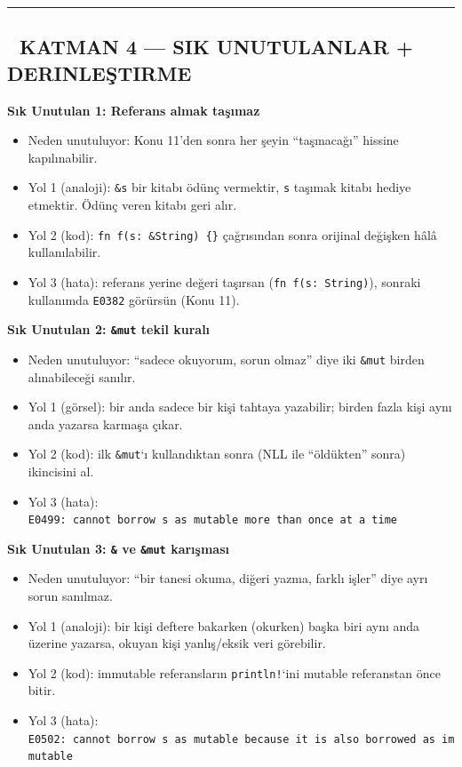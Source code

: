 \documentclass[12pt,a4paper]{article}
\begin{document}
\begin{center}\rule{0.5\linewidth}{0.5pt}\end{center}

\subsection{🔴 KATMAN 4 --- SIK UNUTULANLAR + DERINLEŞTIRME}\label{katman-4-—-sik-unutulanlar-derinleştirme-11}

\textbf{Sık Unutulan 1: Referans almak taşımaz}

\begin{itemize}
\tightlist
\item
  Neden unutuluyor: Konu 11'den sonra her şeyin ``taşınacağı'' hissine kapılınabilir.
\item
  Yol 1 (analoji): \texttt{\&s} bir kitabı ödünç vermektir, \texttt{s} taşımak kitabı hediye etmektir. Ödünç veren kitabı geri alır.
\item
  Yol 2 (kod): \texttt{fn\ f(s:\ \&String)\ \{\}} çağrısından sonra orijinal değişken hâlâ kullanılabilir.
\item
  Yol 3 (hata): referans yerine değeri taşırsan (\texttt{fn\ f(s:\ String)}), sonraki kullanımda \texttt{E0382} görürsün (Konu 11).
\end{itemize}

\textbf{Sık Unutulan 2: \texttt{\&mut} tekil kuralı}

\begin{itemize}
\tightlist
\item
  Neden unutuluyor: ``sadece okuyorum, sorun olmaz'' diye iki \texttt{\&mut} birden alınabileceği sanılır.
\item
  Yol 1 (görsel): bir anda sadece bir kişi tahtaya yazabilir; birden fazla kişi aynı anda yazarsa karmaşa çıkar.
\item
  Yol 2 (kod): ilk \texttt{\&mut}`ı kullandıktan sonra (NLL ile ``öldükten'' sonra) ikincisini al.
\item
  Yol 3 (hata): \texttt{E0499:\ cannot\ borrow\ s\ as\ mutable\ more\ than\ once\ at\ a\ time}
\end{itemize}

\textbf{Sık Unutulan 3: \texttt{\&} ve \texttt{\&mut} karışması}

\begin{itemize}
\tightlist
\item
  Neden unutuluyor: ``bir tanesi okuma, diğeri yazma, farklı işler'' diye ayrı sorun sanılmaz.
\item
  Yol 1 (analoji): bir kişi deftere bakarken (okurken) başka biri aynı anda üzerine yazarsa, okuyan kişi yanlış/eksik veri görebilir.
\item
  Yol 2 (kod): immutable referansların \texttt{println!}`ini mutable referanstan önce bitir.
\item
  Yol 3 (hata): \texttt{E0502:\ cannot\ borrow\ s\ as\ mutable\ because\ it\ is\ also\ borrowed\ as\ immutable}
\end{itemize}
\end{document}

